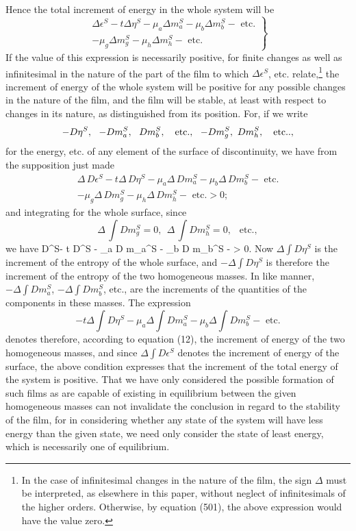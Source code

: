 \documentclass[12pt]{article}
\begin{document}
{Hence the total increment of energy in the whole system will be
\begin{equation}\left. \begin{array}{r} \Delta\epsilon^S- t \Delta \eta^S - \mu_a \Delta m_a^S - \mu_b \Delta m_b^S - \text{ etc.} \\
-  \mu_g \Delta m_g^S - \mu_h \Delta m_h^S- \text{ etc.} \label{516} \end{array} \right\}\end{equation}
If the value of this expression is necessarily positive, for finite changes as well as infinitesimal in the nature of the part of the film to which $\Delta\epsilon^S$, etc. relate,\footnote{In the case of infinitesimal changes in the nature of the film, the sign $\Delta$ must be interpreted, as elsewhere in this paper, without neglect of infinitesimals of the higher orders. Otherwise, by equation (501), the above expression would have the value zero.} the increment of energy of the whole system will be positive for any possible changes in the nature of the film, and the film will be stable, at least with respect to changes in its nature, as distinguished from its position. For, if we write
$$ -D \eta^S, \ \ -D m_a^S,\ \ D m_b^S, \ \ \text{ etc.}, \ \ -D m_g^S, \ \-D m_h^S, \ \ \text{ etc.}.,$$
for the energy, etc. of any element of the surface of discontinuity, we have from the supposition just made
\begin{align}\Delta\, D\epsilon^S- t \Delta \, D\eta^S - \mu_a \Delta \, D m_a^S - \mu_b \Delta \, D m_b^S - \text{ etc.} \nonumber \\
- \mu_g \Delta \, D m_g^S - \mu_h \Delta \, D m_h^S- \text{ etc.}> 0;          \label{517}\end{align}
and integrating for the whole surface, since
$$ \Delta \, \int D m_g^S = 0,\ \ \Delta \, \int D m_h^S = 0,\ \ \text{ etc.}, $$
we have
\eqs \Delta \int D\epsilon^S- t \Delta \int D\eta^S - \mu_a \Delta \int D m_a^S - \mu_b \Delta \int D m_b^S -  > 0.   \label{518} \eqe
Now $\Delta \int D\eta^S$ is the increment of the entropy of the whole surface, and $- \Delta \int D\eta^S$ is therefore the increment of the entropy of the two homogeneous masses. In like manner, $- \Delta \int D m_a^S$, $- \Delta \int D m_b^S$, etc., are the increments of the quantities of the components in these masses. The expression
$$ - t \Delta \int D\eta^S - \mu_a \Delta \int D m_a^S - \mu_b \Delta \int D m_b^S - \text{ etc.} $$
denotes therefore, according to equation (12), the increment of energy of the two homogeneous masses, and since $\Delta \int D\epsilon^S$ denotes the
increment of energy of the surface, the above condition expresses that the increment of the total energy of the system is positive. That we have only considered the possible formation of such films as are capable of existing in equilibrium between the given homogeneous masses can not invalidate the conclusion in regard to the stability of the film, for in considering whether any state of the system will have less energy than the given state, we need only consider the state of least energy, which is necessarily one of equilibrium.

}
\end{document}
